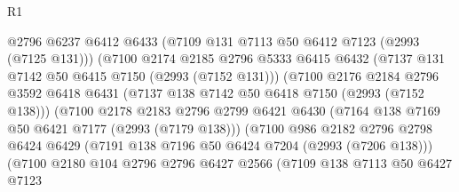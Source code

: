\begin{lexlean}{R1}
\begin{coremodule}
                                    @2796
                                    @6237
                                    @6412
                                    @6433
                                    (@7109 @131 @7113 @50 @6412 @7123 (@2993 (@7125 @131)))
                                    (@7100
                                      @2174
                                      @2185
                                      @2796
                                      @5333
                                      @6415
                                      @6432
                                      (@7137 @131 @7142 @50 @6415 @7150 (@2993 (@7152 @131)))
                                      (@7100
                                        @2176
                                        @2184
                                        @2796
                                        @3592
                                        @6418
                                        @6431
                                        (@7137 @138 @7142 @50 @6418 @7150 (@2993 (@7152 @138)))
                                        (@7100
                                          @2178
                                          @2183
                                          @2796
                                          @2799
                                          @6421
                                          @6430
                                          (@7164 @138 @7169 @50 @6421 @7177 (@2993 (@7179 @138)))
                                          (@7100
                                            @986
                                            @2182
                                            @2796
                                            @2798
                                            @6424
                                            @6429
                                            (@7191 @138 @7196 @50 @6424 @7204 (@2993 (@7206 @138)))
                                            (@7100
                                              @2180
                                              @104
                                              @2796
                                              @2796
                                              @6427
                                              @2566
                                              (@7109
                                                @138
                                                @7113
                                                @50
                                                @6427
                                                @7123

\end{coremodule}
\end{lexlean}
